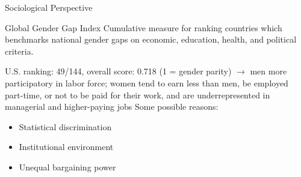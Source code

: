 \documentclass[usenames,dvipsnames]{beamer}
\begin{document}
    
    \begin{frame}{Sociological Perspective}
        \begin{block}{Global Gender Gap Index \emph{\parencite{schwab2017global}}}
            Cumulative measure for ranking countries which benchmarks national gender gaps on economic, education, health, and political criteria.
        \end{block}
        U.S. ranking: 49/144, overall score: 0.718 (1 = gender parity)\newline
        $\rightarrow$ men more participatory in labor force; women tend to earn less than men, be employed part-time, or not to be paid for their work, and are underrepresented in managerial and higher-paying jobs\newline\newline
        Some possible reasons:
        \begin{itemize}
            \item Statistical discrimination \emph{\parencite{tilcsik2021statistical}}
            \item Institutional environment \emph{\parencite{beggs1995institutional}}
            \item Unequal bargaining power \emph{\parencite{folbre2021gender}}
        \end{itemize}
    \end{frame}
    
\end{document}
